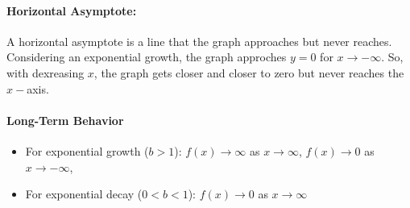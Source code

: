 \paragraph{Horizontal Asymptote:} 
A horizontal asymptote is a line that the graph approaches but never reaches. Considering an exponential growth, the graph approches $y=0$ for $x \rightarrow -\infty$. So, with dexreasing $x$, the graph gets closer and closer to zero but never reaches the $x-$axis.



\paragraph{Long-Term Behavior}
\begin{itemize}
    \item For exponential growth ($b>1$): $f(x) \to \infty$ as $x \to \infty$, $f(x) \to 0$ as $x \to - \infty$, 
    \item For exponential  decay ($0<b<1$): $f(x) \to 0$ as $x \to \infty$ 
\end{itemize}

